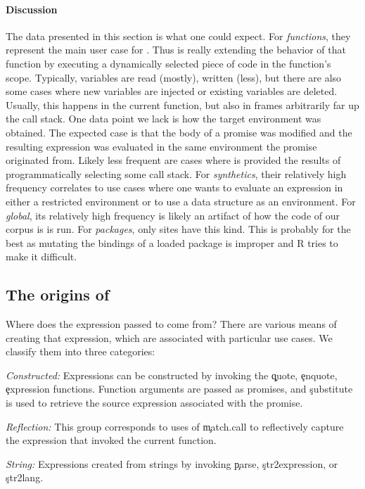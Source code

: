 \documentclass[review,screen,acmsmall,anonymous=true]{acmart}
\begin{document}
\paragraph{Discussion}
The data presented in this section is what one could expect. For {\it
  functions}, they represent the main user case for \eval. Thus \eval is really
extending the behavior of that function by executing a dynamically selected
piece of code in the function's scope. Typically, variables are read (mostly),
written (less), but there are also some cases where new variables are injected
or existing variables are deleted. Usually, this happens in the current
function, but also in frames arbitrarily far up the call stack. One data point
we lack is how the target environment was obtained. The expected case is that
the body of a promise was modified and the resulting expression was evaluated in
the same environment the promise originated from. Likely less frequent are cases
where \eval is provided the results of programmatically selecting some call
stack. For {\it synthetics}, their relatively high frequency correlates to use
cases where one wants to evaluate an expression in either a restricted
environment or to use a data structure as an environment. For {\it global}, its
relatively high frequency is likely an artifact of how the code of our corpus is
is run. For {\it packages}, only \packageNbPackageNamespaceEnvSites sites have
this kind. This is probably for the best as mutating the bindings of
a loaded package is improper and R tries to make it difficult.

\subsection{The origins of \eval}

Where does the expression passed to \eval come from? There are various means of
creating that expression, which are associated with particular use cases. We
classify them into three categories:

\begin{compactitem}[---]
\item {\it Constructed:} Expressions can be constructed by invoking the
  \c{quote}, \c{enquote}, \c{expression} functions. Function arguments are
  passed as promises, and \c{substitute} is used to retrieve the source
  expression associated with the promise.
\item {\it Reflection:} This group corresponds to uses of \c{match.call} to
  reflectively capture the expression that invoked the current function.
\item {\it String:} Expressions created from strings by invoking \c{parse},
  \c{str2expression}, or \c{str2lang}.
\end{compactitem}
\end{document}
